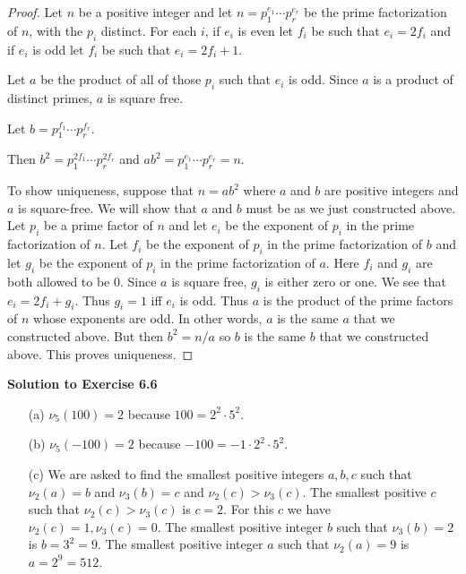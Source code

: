\documentclass[oneside,12pt]{amsart}
\begin{document}
\begin{proof}
Let $n$ be a positive integer and let $n=p_1^{e_1}\cdots p_r^{e_r}$
be the prime factorization of $n$, with the $p_i$ distinct. For each $i$,
if $e_i$ is even let $f_i$ be such that $e_i=2f_i$ and if $e_i$ is odd
let $f_i$ be such that $e_i=2f_i + 1$.

Let $a$ be the product of all of those $p_i$ such that $e_i$ is odd. Since
$a$ is a product of distinct primes, $a$ is square free.

Let $b=p_1^{f_1}\cdots p_r^{f_r}$.

Then $b^2=p_1^{2f_1}\cdots p_r^{2f_r}$ and 
$ab^2=p_1^{e_1}\cdots p_r^{e_r} = n$.

To show uniqueness, suppose that $n=ab^2$ where $a$ and $b$ are positive integers and $a$ is square-free. We will show that $a$ and $b$ must be as we just constructed above. Let $p_i$ be a prime factor of $n$ and let $e_i$ be the exponent of $p_i$ in the prime factorization of $n$. Let $f_i$ be the exponent of $p_i$ in the prime factorization of $b$ and let $g_i$ be the exponent of $p_i$ in the prime factorization of $a$. Here $f_i$ and $g_i$ are both allowed to be 0. Since $a$ is square free, $g_i$ is either zero or one.
We see that $e_i = 2f_i + g_i$.  Thus $g_i=1$ iff $e_i$ is odd. Thus $a$ is
the product of the prime factors of $n$ whose exponents are odd. In
other words, $a$ is the same $a$ that we constructed above. But then $b^2=n/a$ so $b$ is the same $b$ that we constructed above. This proves uniqueness.
\end{proof}

\bigskip

\textbf{Solution to Exercise 6.6}

\begin{enumerate}
\item[(a)] $\nu_5(100) = 2$ because $100=2^2 \cdot 5^2$.
\item[(b)] $\nu_5(-100) = 2$ because $-100=-1 \cdot 2^2 \cdot 5^2$.
\item[(c)] We are asked to find the smallest positive integers $a,b,c$ such that 
$\nu_2(a)=b$ and $\nu_3(b)=c$ and $\nu_2(c) > \nu_3(c)$. The smallest positive $c$ such
that $\nu_2(c) > \nu_3(c)$ is $c=2$. For this $c$ we have 
$\nu_2(c) = 1, \nu_3(c)=0$. The smallest positive integer $b$ such that 
$\nu_3(b)=2$ is $b=3^2=9$. The smallest positive integer $a$ such that
$\nu_2(a)=9$  is $a=2^9=512$.
\end{enumerate}

\bigskip
\end{document}

